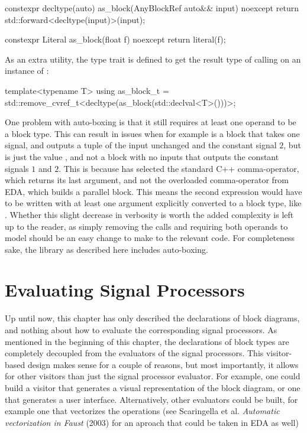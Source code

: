 \begin{cppcodenl}
  constexpr decltype(auto) as_block(AnyBlockRef auto&& input) noexcept
  {
    return std::forward<decltype(input)>(input);
  }

  constexpr Literal as_block(float f) noexcept
  {
    return literal(f);
  }
\end{cppcodenl}

As an extra utility, the  type trait is defined to get the result type of calling  on an instance of :

\begin{cppcodenl}
  template<typename T>
  using as_block_t = std::remove_cvref_t<decltype(as_block(std::declval<T>()))>;
\end{cppcodenl}

One problem with auto-boxing is that it still requires at least one operand to be a block type. This can
result in issues when for example  is a block that takes one signal, and outputs a
tuple of the input unchanged and the constant signal $2$, but
 is just the value , and not a block with no inputs that outputs the constant signals
$1$ and $2$. This is because  has selected the
standard C++ comma-operator, which returns its last argument, and not the overloaded comma-operator from EDA,
which builds a parallel block. This means the second expression would have to be written with at least one
argument explicitly converted to a block type, like .  Whether this slight decrease in
verbosity is worth the added complexity is left up to the reader, as simply removing the
 calls and requiring both operands to model  should be an easy
change to make to the relevant code. For completeness sake, the library as described here includes
auto-boxing.


\section{Evaluating Signal Processors}

Up until now, this chapter has only described the declarations of block diagrams, and nothing about how to
evaluate the corresponding signal processors. As mentioned in the beginning of this chapter, the declarations
of block types are completely decoupled from the evaluators of the signal processors. This visitor-based
design makes sense for a couple of reasons, but most importantly, it allows for other visitors than just the
signal processor evaluator. For example, one could build a visitor that generates a visual representation of
the block diagram, or one that generates a user interface. Alternatively, other evaluators could be built,
for example one that vectorizes the operations (see Scaringella et al. \emph{Automatic vectorization in Faust} (2003)
\autocite{faust_auto_vec} for an aproach that could be taken in EDA as well)

